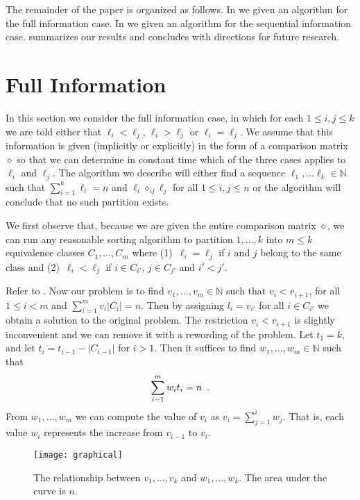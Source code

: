 \documentclass[lotsofwhite]{patmorin}
\newcommand{\N}{\mathbb{N}}
\newcommand{\op}{\diamond}
\newcommand{\opij}{\op_{ij}}
\begin{document}
The remainder of the paper is organized as follows.  In
 we given an algorithm for the full
information case.  In  we given an
algorithm for the sequential information case.  
summarizes our results and concludes with directions for future
research.

\section{Full Information}

In this section we consider the full information case, in which for
each $1\le i,j \le k$ we are told either that $\ell_i< \ell_j$,
$\ell_i > \ell_j$ or $\ell_i = \ell_j$.  We assume that this
information is given (implicitly or explicitly) in the form of a
comparison matrix $\op$ so that we can determine in constant time
which of the three cases applies to $\ell_i$ and $\ell_j$.  The
algorithm we describe will either find a sequence
$\ell_1,\ldots\ell_k\in\N$ such that $\sum_{i=1}^k\ell_i = n$ and
$\ell_i\opij\ell_j$ for all $1\le i,j\le n$ or the algorithm will
conclude that no such partition exists.

We first observe that, because we are given the entire comparison
matrix $\op$, we can run any reasonable sorting algorithm to partition
$1,\ldots,k$ into  $m\le k$ equivalence classes $C_1,\ldots,C_{m}$
where (1)~$\ell_i = \ell_j$ if $i$ and $j$ belong to the same class and
(2)~$\ell_i < \ell_j$ if $i\in C_{i'}$, $j\in C_{j'}$ and $i'< j'$.

Refer to .  Now our problem is to find
$v_1,\ldots,v_{m}\in\N$ such that $v_i < v_{i+1}$, for all $1\le i <
m$ and $\sum_{i=1}^m{v_i|C_i|} = n$.  Then by assigning $l_i=v_{i'}$
for all $i\in C_{i'}$ we obtain a solution to the original problem.
The restriction $v_i < v_{i+1}$ is slightly inconvenient and we
can remove it with a rewording of the problem.  Let $t_1 = k$,
 and let $t_i=t_{i-1}-|C_{i-1}|$ for $i>1$.  Then
it suffices to find $w_1,\ldots,w_m\in\N$ such that
\begin{equation}
       \sum_{i=1}^m w_it_i = n \enspace . \eqlabel{wis}
\end{equation}
From $w_1,\ldots, w_m$ we can compute the value of $v_i$ as 
$v_i=\sum_{j=1}^i w_j$.  That is, each value $w_i$
represents the increase from $v_{i-1}$ to $v_i$.

\begin{figure}
\begin{center}\texttt{[image: graphical]}\end{center}
\caption{The relationship between $v_1,\ldots,v_k$ and
$w_1,\ldots,w_k$. The area under the
curve is $n$.} 
\end{figure}
\end{document}
